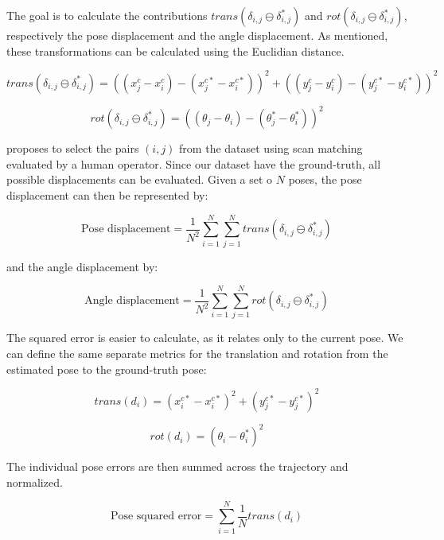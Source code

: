 The goal is to calculate the contributions $trans(\delta_{i,j} \ominus \delta_{i,j}^*)$ and $rot(\delta_{i,j} \ominus \delta_{i,j}^*)$, respectively the pose displacement and the angle displacement. As mentioned, these transformations can be calculated using the Euclidian distance.

\begin{equation}
trans(\delta_{i,j} \ominus \delta_{i,j}^*) =
((x^c_j - x^c_i) - (x^{c*}_j - x^{c*}_i))^2 + 
((y^c_j - y^c_i) - (y^{c*}_j - y^{c*}_i))^2
\end{equation}

\begin{equation}
rot(\delta_{i,j} \ominus \delta_{i,j}^*) = 
((\theta_j - \theta_i) - (\theta_j^* - \theta_i^*))^2
\end{equation}

\citeauthor{kummerle2009measuring} proposes to select the pairs $(i,j)$ from the dataset using scan matching evaluated by a human operator. Since our dataset have the ground-truth, all possible displacements can be evaluated. Given a set o $N$ poses, the pose displacement can then be represented by:

\begin{equation}
\text{Pose displacement} = \frac{1}{N^2} \sum_{i = 1}^N \sum_{j = 1}^N trans(\delta_{i,j} \ominus \delta_{i,j}^*)
\end{equation}

and the angle displacement by:

\begin{equation}
\text{Angle displacement} = \frac{1}{N^2} \sum_{i = 1}^N \sum_{j = 1}^N rot(\delta_{i,j} \ominus \delta_{i,j}^*)
\end{equation}

The squared error is easier to calculate, as it relates only to the current pose. We can define the same separate metrics for the translation and rotation from the estimated pose to the ground-truth pose:

\begin{equation}
trans(d_i) = (x^{c*}_i - x^{c*}_i)^2 + (y^{c*}_j - y^{c*}_j)^2
\end{equation}

\begin{equation}
rot(d_i) = (\theta_i - \theta^*_i)^2
\end{equation}

The individual pose errors are then summed across the trajectory and normalized.

\begin{equation}
\text{Pose squared error} = \sum_{i=1}^N \frac{1}{N} trans(d_i)
\end{equation}

